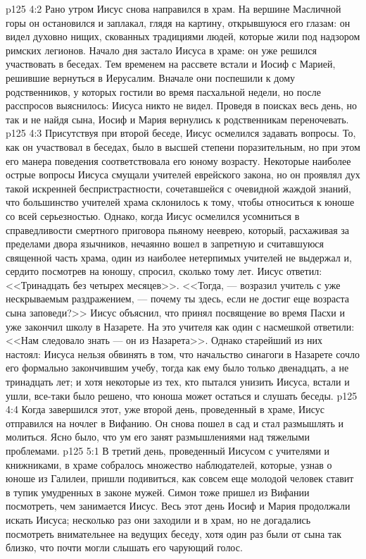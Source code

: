 \vs p125 4:2 Рано утром Иисус снова направился в храм. На вершине Масличной горы он остановился и заплакал, глядя на картину, открывшуюся его глазам: он видел духовно нищих, скованных традициями людей, которые жили под надзором римских легионов. Начало дня застало Иисуса в храме: он уже решился участвовать в беседах. Тем временем на рассвете встали и Иосиф с Марией, решившие вернуться в Иерусалим. Вначале они поспешили к дому родственников, у которых гостили во время пасхальной недели, но после расспросов выяснилось: Иисуса никто не видел. Проведя в поисках весь день, но так и не найдя сына, Иосиф и Мария вернулись к родственникам переночевать.
\vs p125 4:3 Присутствуя при второй беседе, Иисус осмелился задавать вопросы. То, как он участвовал в беседах, было в высшей степени поразительным, но при этом его манера поведения соответствовала его юному возрасту. Некоторые наиболее острые вопросы Иисуса смущали учителей еврейского закона, но он проявлял дух такой искренней беспристрастности, сочетавшейся с очевидной жаждой знаний, что большинство учителей храма склонилось к тому, чтобы относиться к юноше со всей серьезностью. Однако, когда Иисус осмелился усомниться в справедливости смертного приговора пьяному нееврею, который, расхаживая за пределами двора язычников, нечаянно вошел в запретную и считавшуюся священной часть храма, один из наиболее нетерпимых учителей не выдержал и, сердито посмотрев на юношу, спросил, сколько тому лет. Иисус ответил: <<Тринадцать без четырех месяцев>>. <<Тогда, --- возразил учитель с уже нескрываемым раздражением, --- почему ты здесь, если не достиг еще возраста сына заповеди?>> Иисус объяснил, что принял посвящение во время Пасхи и уже закончил школу в Назарете. На это учителя как один с насмешкой ответили: <<Нам следовало знать --- он из Назарета>>. Однако старейший из них настоял: Иисуса нельзя обвинять в том, что начальство синагоги в Назарете сочло его формально закончившим учебу, тогда как ему было только двенадцать, а не тринадцать лет; и хотя некоторые из тех, кто пытался унизить Иисуса, встали и ушли, все\hyp{}таки было решено, что юноша может остаться и слушать беседы.
\vs p125 4:4 Когда завершился этот, уже второй день, проведенный в храме, Иисус отправился на ночлег в Вифанию. Он снова пошел в сад и стал размышлять и молиться. Ясно было, что ум его занят размышлениями над тяжелыми проблемами.
\vs p125 5:1 В третий день, проведенный Иисусом с учителями и книжниками, в храме собралось множество наблюдателей, которые, узнав о юноше из Галилеи, пришли подивиться, как совсем еще молодой человек ставит в тупик умудренных в законе мужей. Симон тоже пришел из Вифании посмотреть, чем занимается Иисус. Весь этот день Иосиф и Мария продолжали искать Иисуса; несколько раз они заходили и в храм, но не догадались посмотреть внимательнее на ведущих беседу, хотя один раз были от сына так близко, что почти могли слышать его чарующий голос.
